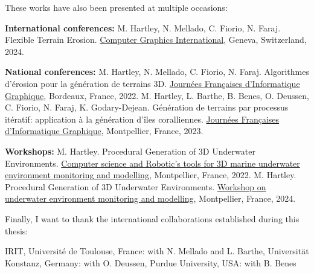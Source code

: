 These works have also been presented at multiple occasions:
\begin{Itemize}
    \Item{} \textbf{International conferences:}
    \Item{} M. Hartley, N. Mellado, C. Fiorio, N. Faraj. Flexible Terrain Erosion. \ul{Computer Graphics International}, Geneva, Switzerland, 2024.
\end{Itemize}
\begin{Itemize}
    \Item{} \textbf{National conferences:}
    \Item{} M. Hartley, N. Mellado, C. Fiorio, N. Faraj. Algorithmes d'érosion pour la génération de terrains 3D. \ul{Journées Françaises d'Informatique Graphique}, Bordeaux, France, 2022.
    \Item{} M. Hartley, L. Barthe, B. Benes, O. Deussen, C. Fiorio, N. Faraj, K. Godary-Dejean. Génération de terrains par processus itératif: application à la génération d'îles coralliennes. \ul{Journées Françaises d'Informatique Graphique}, Montpellier, France, 2023.
\end{Itemize}
\begin{Itemize}
    \Item{} \textbf{Workshops:}
    \Item{} M. Hartley. Procedural Generation of 3D Underwater Environments. \ul{Computer science and Robotic's tools for 3D marine underwater environment monitoring and modelling}, Montpellier, France, 2022.
    \Item{} M. Hartley. Procedural Generation of 3D Underwater Environments. \ul{Workshop on underwater environment monitoring and modelling}, Montpellier, France, 2024.
\end{Itemize}

Finally, I want to thank the international collaborations established during this thesis:
\begin{Itemize}
    \Item{} IRIT, Université de Toulouse, France: with N. Mellado and L. Barthe,
    \Item{} Universität Konstanz, Germany: with O. Deussen,
    \Item{} Purdue University, USA: with B. Benes
\end{Itemize}

